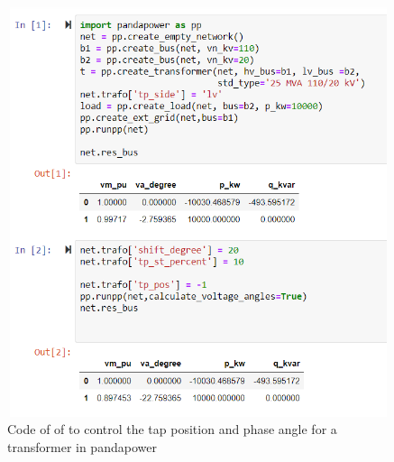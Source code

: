 \documentclass[class=book, crop=false]{standalone}
\begin{document}
\begin{figure}[H]
    \center
    \includegraphics[height=12cm, width=12cm]{figures/control_transformer.PNG}
    \caption[size = 9]{Code of of to control the tap position and phase angle for a transformer in pandapower}
    \label{fig:method:control_transformer}
\end{figure}
\end{document}
